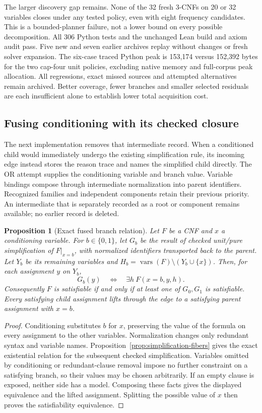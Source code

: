\documentclass[11pt,a4paper]{article}
\numberwithin{equation}{section}
\theoremstyle{plain}
\newtheorem{proposition}[lemma]{Proposition}
\theoremstyle{definition}
\theoremstyle{remark}
\begin{document}
The larger discovery gap remains. None of the 32 fresh 3-CNFs on 20 or 32 variables closes under any tested policy, even with eight frequency candidates. This is a bounded-planner failure, not a lower bound on every possible decomposition. All 306 Python tests and the unchanged Lean build and axiom audit pass. Five new and seven earlier archives replay without changes or fresh solver expansion. The six-case traced Python peak is 153,174 versus 152,392 bytes for the two cap-four unit policies, excluding native memory and full-corpus peak allocation. All regressions, exact missed sources and attempted alternatives remain archived. Better coverage, fewer branches and smaller selected residuals are each insufficient alone to establish lower total acquisition cost.

\subsection{Fusing conditioning with its checked closure}
\label{sec:fused-conditioning-closure}

The next implementation removes that intermediate record. When a conditioned child would immediately undergo the existing simplification rule, its incoming edge instead stores the reason trace and names the simplified child directly. The OR attempt supplies the conditioning variable and branch value. Variable bindings compose through intermediate normalization into parent identifiers. Recognized families and independent components retain their previous priority. An intermediate that is separately recorded as a root or component remains available; no earlier record is deleted.

\begin{proposition}[Exact fused branch relation]
\label{prop:fused-conditioning-closure}
Let $F$ be a CNF and $x$ a conditioning variable. For $b\in\{0,1\}$, let $G_b$ be the result of checked unit/pure simplification of $F\vert_{x=b}$, with normalized identifiers transported back to the parent. Let $Y_b$ be its remaining variables and $H_b=\operatorname{vars}(F)\setminus(Y_b\cup\{x\})$. Then, for each assignment $y$ on $Y_b$,
\[
 G_b(y)\quad\Longleftrightarrow\quad \exists h\ F(x=b,y,h).
\]
Consequently $F$ is satisfiable if and only if at least one of $G_0,G_1$ is satisfiable. Every satisfying child assignment lifts through the edge to a satisfying parent assignment with $x=b$.
\end{proposition}

\begin{proof}
Conditioning substitutes $b$ for $x$, preserving the value of the formula on every assignment to the other variables. Normalization changes only redundant syntax and variable names. Proposition~\ref{prop:simplification-fibers} gives the exact existential relation for the subsequent checked simplification. Variables omitted by conditioning or redundant-clause removal impose no further constraint on a satisfying branch, so their values may be chosen arbitrarily. If an empty clause is exposed, neither side has a model. Composing these facts gives the displayed equivalence and the lifted assignment. Splitting the possible value of $x$ then proves the satisfiability equivalence.
\end{proof}
\end{document}
